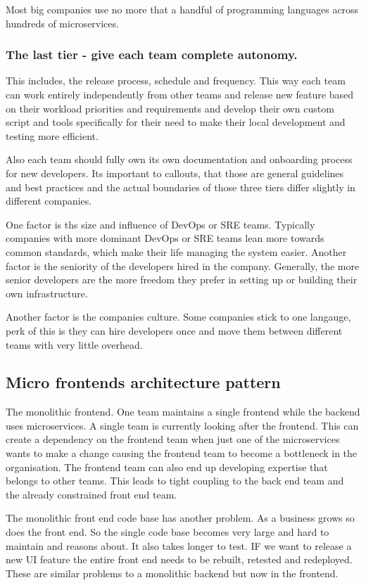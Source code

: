 \documentclass[a4paper, 11pt]{book}
\begin{document}
    Most big companies use no more that a handful of programming languages across hundreds of microservices.

    \subsubsection{The last tier - give each team complete autonomy.}
    This includes, the release process, schedule and frequency.
    This way each team can work entirely independently from other teams and release new feature based on their workload priorities and requirements and develop their own custom script and tools specifically for their need to make their local development and testing more efficient.

    Also each team should fully own its own documentation and onboarding process for new developers.
    Its important to callouts, that those are general guidelines and best practices and the actual boundaries of those three tiers differ slightly in different companies.

    One factor is ths size and influence of DevOps or SRE teams.
    Typically companies with more dominant DevOps or SRE teams lean more towards common standards, which make their life managing the system easier.
    Another factor is the seniority of the developers hired in the company.
    Generally, the more senior developers are the more freedom they prefer in setting up or building their own infrastructure.

    Another factor is the companies culture.
    Some companies stick to one langauge, perk of this is they can hire developers once and move them between different teams with very little overhead.

    \subsection{Micro frontends architecture pattern}
    The monolithic frontend.
    One team maintains a single frontend while the backend uses microservices.
    A single team is currently looking after the frontend.
    This can create a dependency on the frontend team when just one of the microservices wants to make a change causing the frontend team to become a bottleneck in the organisation.
    The frontend team can also end up developing expertise that belongs to other teams.
    This leads to tight coupling to the back end team and the already constrained front end team.

    The monolithic front end code base has another problem.
    As a business grows so does the front end.
    So the single code base becomes very large and hard to maintain and reasons about.
    It also takes longer to test.
    IF we want to release a new UI feature the entire front end needs to be rebuilt, retested and redeployed.
    These are similar problems to a monolithic backend but now in the frontend.
\end{document}
